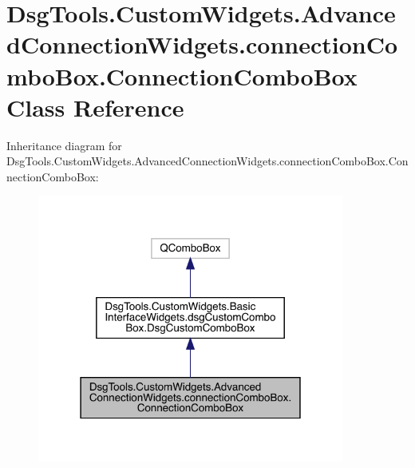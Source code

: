 \hypertarget{class_dsg_tools_1_1_custom_widgets_1_1_advanced_connection_widgets_1_1connection_combo_box_1_1_connection_combo_box}{}\section{Dsg\+Tools.\+Custom\+Widgets.\+Advanced\+Connection\+Widgets.\+connection\+Combo\+Box.\+Connection\+Combo\+Box Class Reference}
\label{class_dsg_tools_1_1_custom_widgets_1_1_advanced_connection_widgets_1_1connection_combo_box_1_1_connection_combo_box}


Inheritance diagram for Dsg\+Tools.\+Custom\+Widgets.\+Advanced\+Connection\+Widgets.\+connection\+Combo\+Box.\+Connection\+Combo\+Box\+:
\nopagebreak
\begin{figure}[H]
\begin{center}
\leavevmode
\includegraphics[width=286pt]{class_dsg_tools_1_1_custom_widgets_1_1_advanced_connection_widgets_1_1connection_combo_box_1_1_ca7c5ac6f9acc78ea6fedd05ea51d032c}
\end{center}
\end{figure}


